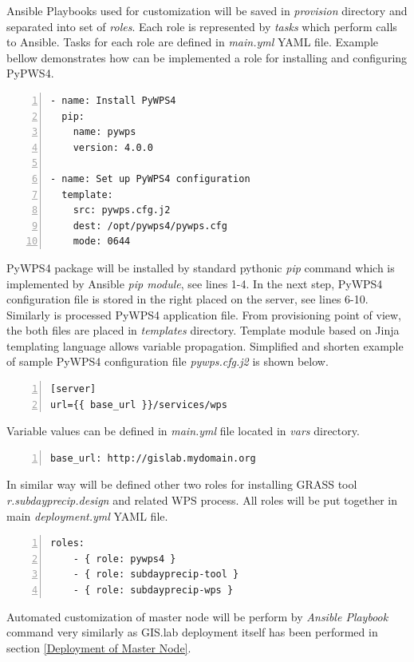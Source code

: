 \documentclass{isprs}
\begin{document}
Ansible Playbooks used for customization will be saved in
\textit{provision} directory and separated into set of
\textit{roles}. Each role is represented by \textit{tasks} which
perform calls to Ansible. Tasks for each role are defined in
\textit{main.yml} YAML file. Example bellow demonstrates how can be
implemented a role for installing and configuring PyPWS4.

\begin{lstlisting}[numbers=left,xleftmargin=1em]
- name: Install PyWPS4
  pip:
    name: pywps
    version: 4.0.0

- name: Set up PyWPS4 configuration
  template:
    src: pywps.cfg.j2
    dest: /opt/pywps4/pywps.cfg
    mode: 0644
\end{lstlisting}

PyWPS4 package will be installed by standard pythonic \textit{pip}
command which is implemented by Ansible \textit{pip module}, see lines
1-4. In the next step, PyWPS4 configuration file is stored in the
right placed on the server, see lines 6-10. Simi\-larly is processed
PyWPS4 application file. From provisioning point of view, the both
files are placed in \textit{templates} directory. Template module
based on Jinja templating language allows variable
propagation. Simplified and shorten example of sample PyWPS4
configuration file \textit{pywps.cfg.j2} is shown below.

\begin{lstlisting}[numbers=left,xleftmargin=1em]
[server]
url={{ base_url }}/services/wps
\end{lstlisting}

Variable values can be defined in \textit{main.yml} file located in
\textit{vars} directory.

\begin{lstlisting}[numbers=left,xleftmargin=1em]
base_url: http://gislab.mydomain.org
\end{lstlisting}

In similar way will be defined other two roles for installing GRASS
tool \textit{r.subdayprecip.design} and related WPS process. All roles
will be put together in main \textit{deployment.yml} YAML file.

\begin{lstlisting}[numbers=left,xleftmargin=1em]
roles:
    - { role: pywps4 }
    - { role: subdayprecip-tool }
    - { role: subdayprecip-wps }
\end{lstlisting}

Automated customization of master node will be perform by
\textit{Ansible Playbook} command very similarly as GIS.lab deployment
itself has been performed in section \ref{Deployment of Master Node}.
\end{document}
